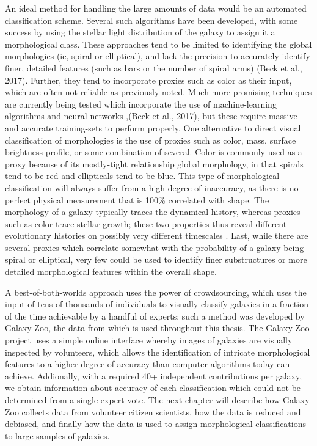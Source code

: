An ideal method for handling the large amounts of data would be an automated classification scheme. Several such algorithms have been developed, with some success \citep{Odewahn2002,Peng2002,Conselice2003,Scarlata2007} by using the stellar light distribution of the galaxy to assign it a morphological class. These approaches tend to be limited to identifying the global morphologies (ie, spiral or elliptical), and lack the precision to accurately identify finer, detailed features (such as bars or the number of spiral arms) (Beck et al., 2017). Further, they tend to incorporate proxies such as color as their input, which are often not reliable as previously noted. Much more promising techniques are currently being tested which incorporate the use of machine-learning algorithms and neural networks \citep{Dieleman2015, Huertas-Company2015},(Beck et al., 2017), but these require massive and accurate training-sets to perform properly. 
One alternative to direct visual classification of morphologies is the use of proxies such as color, mass, surface brightness profile, or some combination of several. Color is commonly used as a proxy because of its mostly-tight relationship global morphology, in that spirals tend to be red and ellipticals tend to be blue. This type of morphological classification will always suffer from a high degree of inaccuracy, as there is no perfect physical measurement that is 100\% correlated with shape. The morphology of a galaxy typically traces the dynamical history, whereas proxies such as color trace stellar growth; these two properties thus reveal different evolutionary histories on possibly very different timescales \citep{Fortson2012}. Last, while there are several proxies which correlate somewhat with the probability of a galaxy being spiral or elliptical, very few could be used to identify finer substructures or more detailed morphological features within the overall shape. 

A best-of-both-worlds approach uses the power of crowdsourcing, which uses the input of tens of thousands of individuals to visually classify galaxies in a fraction of the time achievable by a handful of experts; such a method was developed by Galaxy Zoo, the data from which is used throughout this thesis. The Galaxy Zoo project uses a simple online interface whereby images of galaxies are visually inspected by volunteers, which allows the identification of intricate morphological features to a higher degree of accuracy than computer algorithms today can achieve. Addionally, with a required 40+ independent contributions per galaxy, we obtain information about accuracy of each classification which could not be determined from a single expert vote. The next chapter will describe how Galaxy Zoo collects data from volunteer citizen scientists, how the data is reduced and debiased, and finally how the data is used to assign morphological classifications to large samples of galaxies. 








